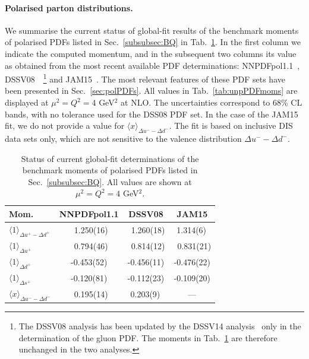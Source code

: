 \paragraph{Polarised parton distributions.}
%
We summarise the current status of global-fit results of the benchmark
moments of polarised PDFs listed in Sec.~\ref{subsubsec:BQ} in 
Tab.~\ref{tab:polPDFmoms}.
%
In the first column we indicate the computed momentum, and in the subsequent 
two columns its value as obtained from the most recent available PDF 
determinations: NNPDFpol1.1~\cite{Nocera:2014gqa}, 
DSSV08~\cite{deFlorian:2009vb}~\footnote{The DSSV08 analysis has been updated
by the DSSV14 analysis~\cite{deFlorian:2014yva} only in the determination
of the gluon PDF. The moments in Tab.~\ref{tab:polPDFmoms} are therefore  
unchanged in the two analyses.} and JAM15~\cite{Sato:2016tuz}.
%
The most relevant features of these PDF sets have been presented in
Sec.~\ref{sec:polPDFs}.
%
All values in Tab.~\ref{tab:unpPDFmoms} are displayed
at $\mu^2=Q^2=4$ GeV$^2$ at NLO.
%
The uncertainties correspond to 68\% CL bands, with no tolerance used for the 
DSS08 PDF set.
%
In the case of the JAM15 fit, we do not provide a value for 
$\langle x \rangle _{\Delta u^--\Delta d^-}$.
%
The fit is based on inclusive DIS data sets only, which are not sensitive to 
the valence distribution $\Delta u^- - \Delta d^-$.

\begin{table}[!t]
\centering
\renewcommand{\arraystretch}{1.2}
\begin{tabular}{lccc}
\toprule
Mom. 
& NNPDFpol1.1 & DSSV08 & JAM15 \\
\midrule
$\langle 1 \rangle_{\Delta u^+-\Delta d^+}$ &
\ 1.250(16) & \ 1.260(18) & 1.314(6)\, \\
$\langle 1 \rangle_{\Delta u^+}$ &
\ 0.794(46) & \ 0.814(12) & \ 0.831(21)\\
$\langle 1 \rangle_{\Delta d^+}$ &  
-0.453(52)  &  -0.456(11) &  -0.476(22)\\
$\langle 1 \rangle_{\Delta s^+}$ &  
-0.120(81)  &  -0.112(23) &  -0.109(20)\\
$\langle x \rangle_{\Delta u^- - \Delta d^-}$ &     
\ 0.195(14) &  0.203(9)\, &  --- \\
\bottomrule
\end{tabular}
\caption{\small Status of current global-fit determinations of the 
benchmark moments of polarised PDFs listed in Sec.~\ref{subsubsec:BQ}.
All values are shown at $\mu^2=Q^2=4$ GeV$^2$.}
\label{tab:polPDFmoms}
\end{table}

